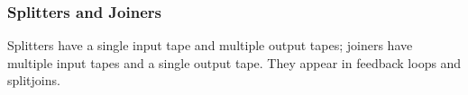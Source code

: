 \documentclass[11pt]{article}
\newcommand{\new}{\marginpar{\footnotesize \textbf{~~--~New~--}}}
\begin{document}
\subsubsection{Splitters and Joiners}
\label{sec:splitters-joiners}

Splitters have a single input tape and multiple output tapes; joiners
have multiple input tapes and a single output tape.  They appear in
feedback loops and splitjoins.






\end{document}
